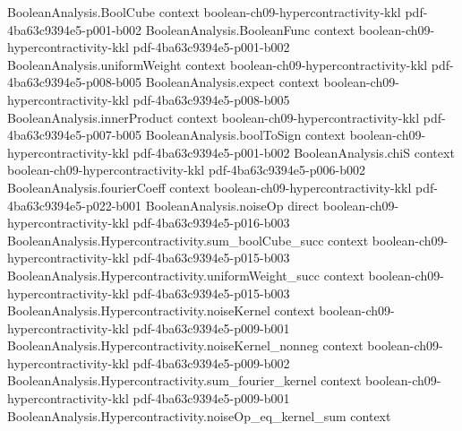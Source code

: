 \begin{theorem}
\label{BooleanAnalysis.Hypercontractivity.hypercontractivity_induction}
\leanok
{}
\proofstep
  {BooleanAnalysis.BoolCube}
  {context}
  {boolean-ch09-hypercontractivity-kkl}
  {pdf-4ba63c9394e5-p001-b002}
\proofstep
  {BooleanAnalysis.BooleanFunc}
  {context}
  {boolean-ch09-hypercontractivity-kkl}
  {pdf-4ba63c9394e5-p001-b002}
\proofstep
  {BooleanAnalysis.uniformWeight}
  {context}
  {boolean-ch09-hypercontractivity-kkl}
  {pdf-4ba63c9394e5-p008-b005}
\proofstep
  {BooleanAnalysis.expect}
  {context}
  {boolean-ch09-hypercontractivity-kkl}
  {pdf-4ba63c9394e5-p008-b005}
\proofstep
  {BooleanAnalysis.innerProduct}
  {context}
  {boolean-ch09-hypercontractivity-kkl}
  {pdf-4ba63c9394e5-p007-b005}
\proofstep
  {BooleanAnalysis.boolToSign}
  {context}
  {boolean-ch09-hypercontractivity-kkl}
  {pdf-4ba63c9394e5-p001-b002}
\proofstep
  {BooleanAnalysis.chiS}
  {context}
  {boolean-ch09-hypercontractivity-kkl}
  {pdf-4ba63c9394e5-p006-b002}
\proofstep
  {BooleanAnalysis.fourierCoeff}
  {context}
  {boolean-ch09-hypercontractivity-kkl}
  {pdf-4ba63c9394e5-p022-b001}
\proofstep
  {BooleanAnalysis.noiseOp}
  {direct}
  {boolean-ch09-hypercontractivity-kkl}
  {pdf-4ba63c9394e5-p016-b003}
\proofstep
  {BooleanAnalysis.Hypercontractivity.sum_boolCube_succ}
  {context}
  {boolean-ch09-hypercontractivity-kkl}
  {pdf-4ba63c9394e5-p015-b003}
\proofstep
  {BooleanAnalysis.Hypercontractivity.uniformWeight_succ}
  {context}
  {boolean-ch09-hypercontractivity-kkl}
  {pdf-4ba63c9394e5-p015-b003}
\proofstep
  {BooleanAnalysis.Hypercontractivity.noiseKernel}
  {context}
  {boolean-ch09-hypercontractivity-kkl}
  {pdf-4ba63c9394e5-p009-b001}
\proofstep
  {BooleanAnalysis.Hypercontractivity.noiseKernel_nonneg}
  {context}
  {boolean-ch09-hypercontractivity-kkl}
  {pdf-4ba63c9394e5-p009-b002}
\proofstep
  {BooleanAnalysis.Hypercontractivity.sum_fourier_kernel}
  {context}
  {boolean-ch09-hypercontractivity-kkl}
  {pdf-4ba63c9394e5-p009-b001}
\proofstep
  {BooleanAnalysis.Hypercontractivity.noiseOp_eq_kernel_sum}
  {context}

\end{theorem}
